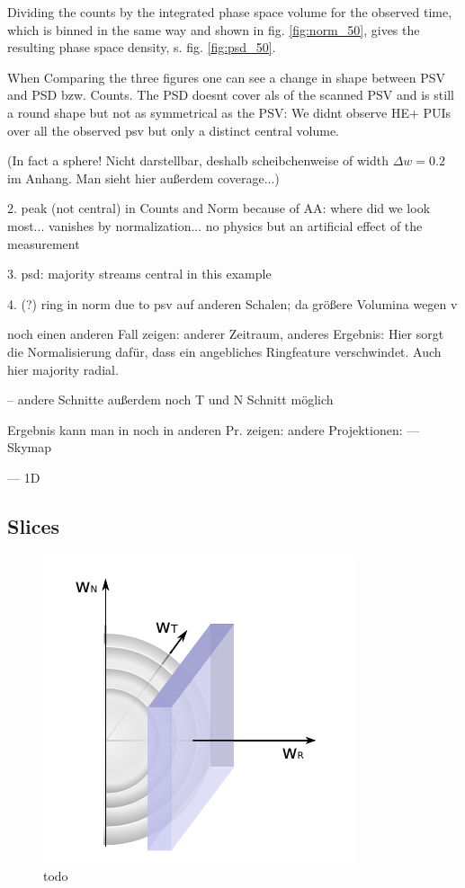 Dividing the counts by the integrated phase space volume for the observed time, which is binned in the same way and shown in fig. \ref{fig:norm_50}, gives the resulting phase space density, s. fig. \ref{fig:psd_50}.

When Comparing the three figures one can see a change in shape between PSV and PSD bzw. Counts. The PSD doesnt cover als of the scanned PSV and is still a round shape but not as symmetrical as the PSV: We didnt observe HE+ PUIs over all the observed psv but only a distinct central volume.


(In fact a sphere! Nicht darstellbar, deshalb scheibchenweise of width $\Delta w = 0.2$  im Anhang. Man sieht hier außerdem coverage...)


2. peak (not central) in Counts and Norm because of AA: where did we look most... vanishes by normalization... no physics but an artificial effect of the measurement

3. psd: majority streams central in this example

4. (?) ring in norm due to psv auf anderen Schalen; da größere Volumina wegen v





noch einen anderen Fall zeigen: anderer Zeitraum, anderes Ergebnis:
Hier sorgt die Normalisierung dafür, dass ein angebliches Ringfeature verschwindet. Auch hier majority radial.

-- andere Schnitte
außerdem noch T und N Schnitt möglich


Ergebnis kann man in noch in anderen Pr. zeigen:
andere Projektionen:
--- Skymap

--- 1D






\clearpage
\subsection{Slices}



\begin{figure}[h]
	\includegraphics[width=.4\textwidth]{Figures/slice_R2.pdf}
	\centering
	\caption{todo}
	\label{fig:sketch_slice_R}
\end{figure}

